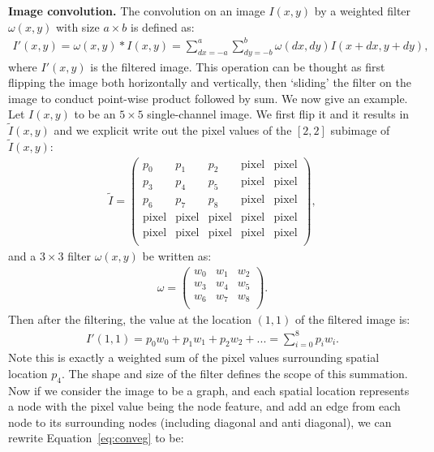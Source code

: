 \vspace{2mm}
\noindent \textbf{Image convolution.} The convolution on an image $I(x, y)$ by a weighted filter $\omega(x,y)$ with size $a \times b$ is defined as:
\begin{gather}
I'(x, y) = \omega(x, y) \ast I(x, y) = \sum_{dx = -a}^{a}\sum_{dy=-b}^{b}\omega(dx, dy)I(x + dx, y + dy),
\end{gather}
where $I'(x, y)$ is the filtered image. This operation can be thought as first flipping the image both horizontally and vertically, then `sliding' the filter on the image to conduct point-wise product followed by sum. We now give an example. Let $I(x, y)$ to be an $5 \times 5$ single-channel image. We first flip it and it results in $\tilde I(x, y)$ and we explicit write out the pixel values of the $[2, 2]$ subimage of $\tilde I(x, y)$:
\begin{gather}
\tilde I= \left(
\begin{array}{ccccc}
 p_0 & p_1 & p_2 & \text{pixel} & \text{pixel} \\
 p_3 & p_4 & p_5 & \text{pixel} & \text{pixel} \\
 p_6 & p_7 & p_8 & \text{pixel} & \text{pixel} \\
 \text{pixel} & \text{pixel} & \text{pixel} & \text{pixel} & \text{pixel} \\
 \text{pixel} & \text{pixel} & \text{pixel} & \text{pixel} & \text{pixel} \\
\end{array}
\right),
\end{gather}
and a $3 \times 3$ filter $\omega(x, y)$ be written as: 
\begin{gather}
\omega = \left(
\begin{array}{ccc}
 w_0 & w_1 & w_2 \\
 w_3 & w_4 & w_5 \\
 w_6 & w_7 & w_8 \\
\end{array}
\right).
\end{gather}
Then after the filtering, the value at the location $(1, 1)$ of the filtered image is:
\begin{gather}
\label{eq:conveg}
I'(1, 1) = p_0 w_0 + p_1 w_1 + p_2 w_2 + ... = \sum_{i = 0}^8 p_i w_i.
\end{gather}
Note this is exactly a weighted sum of the pixel values surrounding spatial location $p_4$. The shape and size of the filter defines the scope of this summation. Now if we consider the image to be a graph, and each spatial location represents a node with the pixel value being the node feature, and add an edge from each node to its surrounding nodes (including diagonal and anti diagonal), we can rewrite Equation~\ref{eq:conveg} to be:
